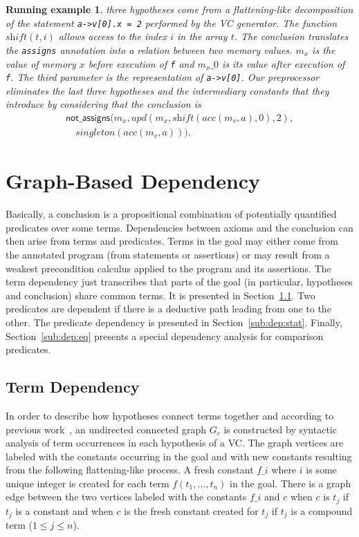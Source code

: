 \documentclass{acm_proc_article-sp}
\theoremstyle{nonumberplain}
\newtheorem{xpl}{Running example}}
\begin{document}
\begin{xpl}
three hypotheses come from a flattening-like decomposition of the
statement \texttt{a->v[0].x = 2} performed by the VC generator. The
function $\textit{shift}(t,i)$ allows access to the index $i$ in the
array $t$. The conclusion translates the \texttt{assigns} annotation
into a relation between two memory values. $m_x$ is the value of memory
$x$ before execution of \verb+f+ and $m_x\_0$ is its value after
execution of \verb+f+. The third parameter is the representation of
\texttt{a->v[0]}. Our preprocessor eliminates the last
three hypotheses and the intermediary constants that they introduce by
considering that the conclusion is
\begin{equation}
\begin{array}{l}
\textsf{not\_assigns}(
 m_x,
 \textit{upd}(m_x,\textit{shift}(\textit{acc}(m_v,a),0),2), \\
 \quad \textit{singleton}(
   \textit{acc}(  
      m_v, 
      a
   )
 )
).
\end{array}  \tag{$C$} 
\end{equation}
\end{xpl}


\section{Graph-Based Dependency}\label{sec:memorizing}
Basically, a conclusion is a propositional combination of potentially
quantified predicates over some terms. Dependencies between axioms and
the conclusion can then arise from terms and predicates. Terms in the
goal may either come from the annotated program (from statements or
assertions) or may result from a weakest precondition calculus applied
to the program and its assertions. The term dependency just transcribes
that parts of the goal (in particular, hypotheses and conclusion) share
common terms. It is presented in Section~\ref{sub:dep:dyn}. Two
predicates are dependent if there is a deductive path leading from one
to the other. The predicate dependency is presented in
Section~\ref{sub:dep:stat}. Finally, Section~\ref{sub:dep:eq} presents
a special dependency analysis for comparison predicates.



\subsection{Term Dependency}\label{sub:dep:dyn}
In order to describe how hypotheses connect terms together and
according to previous work~\cite{couchot07FTP}, an undirected connected
graph $G_c$ is constructed by syntactic ana\-lysis of term occurrences
in each hypothesis of a VC. The graph vertices are labeled with the
constants occurring in the goal and with new constants resulting from
the following flattening-like process. A fresh constant \(f\_i\) where
$i$ is some unique integer is created for each term
\(f(t_1,\ldots,t_n)\) in the goal. There is a graph edge between the
two vertices labeled with the constants $f\_i$ and $c$ when $c$ is
$t_j$ if $t_j$ is a constant and when $c$ is the fresh constant created
for $t_j$ if $t_j$ is a compound term ($1 \leq j \leq n$).
\end{document}
